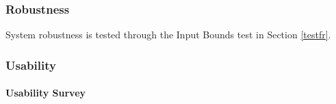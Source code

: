 \documentclass[12pt, titlepage]{article}
\begin{document}

\subsubsection{Robustness}
		
System robustness is tested through the Input Bounds test in Section \ref{testfr}.

\subsubsection{Usability}

\paragraph{Usability Survey}
\end{document}
